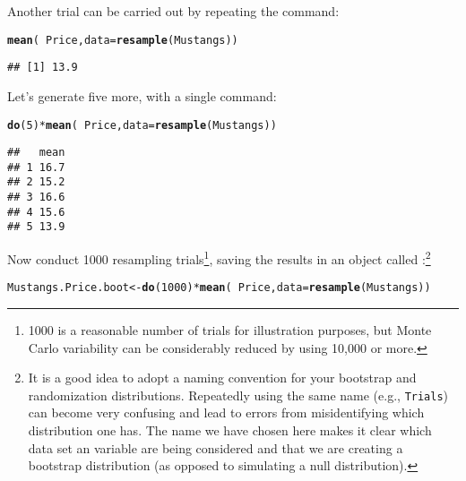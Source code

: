 \documentclass[11pt]{article}\usepackage[]{graphicx}\usepackage[]{color}
\makeatletter
\newcommand{\hlnum}[1]{\textcolor[rgb]{0.686,0.059,0.569}{#1}}%
\newcommand{\hlopt}[1]{\textcolor[rgb]{0,0,0}{#1}}%
\newcommand{\hlstd}[1]{\textcolor[rgb]{0.345,0.345,0.345}{#1}}%
\newcommand{\hlkwb}[1]{\textcolor[rgb]{0.69,0.353,0.396}{#1}}%
\newcommand{\hlkwc}[1]{\textcolor[rgb]{0.333,0.667,0.333}{#1}}%
\newcommand{\hlkwd}[1]{\textcolor[rgb]{0.737,0.353,0.396}{\textbf{#1}}}%
\newenvironment{kframe}{%
 \def\at@end@of@kframe{}%
 \ifinner\ifhmode%
  \def\at@end@of@kframe{\end{minipage}}%
  \begin{minipage}{\columnwidth}%
 \fi\fi%
 \def\FrameCommand##1{\hskip\@totalleftmargin \hskip-\fboxsep
 \colorbox{shadecolor}{##1}\hskip-\fboxsep
     \hskip-\linewidth \hskip-\@totalleftmargin \hskip\columnwidth}%
 \MakeFramed {\advance\hsize-\width
   \@totalleftmargin\z@ \linewidth\hsize
   \@setminipage}}%
 {\par\unskip\endMakeFramed%
 \at@end@of@kframe}
\newenvironment{knitrout}{}{} %
\makeatother
\begin{document}
Another trial can be carried out by repeating the command:
\begin{knitrout}
\color{fgcolor}\begin{kframe}
\begin{alltt}
\hlkwd{mean}\hlstd{(}\hlopt{~} \hlstd{Price,} \hlkwc{data} \hlstd{=} \hlkwd{resample}\hlstd{(Mustangs))}
\end{alltt}
\begin{verbatim}
## [1] 13.9
\end{verbatim}
\end{kframe}
\end{knitrout}
Let's generate five more, with a single command: 
\begin{knitrout}
\color{fgcolor}\begin{kframe}
\begin{alltt}
\hlkwd{do}\hlstd{(}\hlnum{5}\hlstd{)} \hlopt{*} \hlkwd{mean}\hlstd{(}\hlopt{~} \hlstd{Price,} \hlkwc{data} \hlstd{=} \hlkwd{resample}\hlstd{(Mustangs))}
\end{alltt}
\begin{verbatim}
##   mean
## 1 16.7
## 2 15.2
## 3 16.6
## 4 15.6
## 5 13.9
\end{verbatim}
\end{kframe}
\end{knitrout}
Now conduct 1000 resampling trials\footnote{1000 is a reasonable number of trials 
for illustration purposes, but Monte Carlo variability can be considerably reduced
by using 10,000 or more.
}, 
saving the results in an object
called :\footnote{It is a good idea to adopt a 
naming convention for your bootstrap and randomization distributions.  Repeatedly using
the same name (e.g., \texttt{Trials}) can become very confusing and lead to 
errors from misidentifying which distribution one has.  The name we have chosen here
makes it clear which data set an variable are being considered and that we are 
creating a bootstrap distribution (as opposed to simulating a null distribution).}
\begin{knitrout}
\color{fgcolor}\begin{kframe}
\begin{alltt}
\hlstd{Mustangs.Price.boot} \hlkwb{<-} \hlkwd{do}\hlstd{(}\hlnum{1000}\hlstd{)} \hlopt{*} \hlkwd{mean}\hlstd{(}\hlopt{~} \hlstd{Price,} \hlkwc{data} \hlstd{=} \hlkwd{resample}\hlstd{(Mustangs))}
\end{alltt}
\end{kframe}
\end{knitrout}
\end{document}
